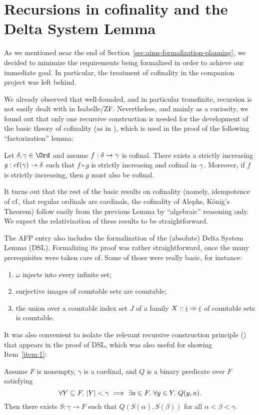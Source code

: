 \section{Recursions in cofinality and the Delta System Lemma}\label{sec:recursions-cofinality}

As we mentioned near the end of
Section~\ref{sec:aims-formalization-planning}, we decided to minimize
the requirements being formalized in order to achieve our immediate
goal. In particular, the treatment of cofinality in the companion
project \cite{Delta_System_Lemma-AFP} was left behind.

We already observed that well-founded, and in particular transfinite,
recursion is not easily dealt with in Isabelle/ZF. Nevertheless, and
mainly as a curiosity, we found out that only one recursive
construction is needed for the development of the basic theory of
cofinality (as in \cite[Sect.~I.13]{kunen2011set}), which is used in
the proof of the following “factorization” lemma:

\begin{lemma}
  Let $\del,\ga\in\Ord$ and assume $f:\delta\to\gamma$ is cofinal.  There exists
  a strictly increasing $g:\operatorname{cf}(\gamma)\to \delta$ such that $f\circ g$ is
  strictly increasing and cofinal in $\gamma$. Moreover, if $f$ is
  strictly increasing, then $g$ must also be cofinal.
\end{lemma}

It turns out that the rest of the basic results on cofinality (namely,
idempotence of $\operatorname{cf}$, that regular ordinals are cardinals, the
cofinality of Alephs, König's Theorem) follow easily from the previous
Lemma by “algebraic” reasoning only.
We expect the relativization of these
results to be straightforward.

The AFP entry \cite{Delta_System_Lemma-AFP} also includes the
formalization of the (absolute) Delta System Lemma (DSL). Formalizing its
proof was rather straightforward, once the many prerequisites were
taken care of. Some of those were really basic, for instance:
\begin{enumerate}
\item \label{item:1}$\omega$ injects into every infinite set;
\item \label{item:2}surjective images of countable sets are countable;
\item \label{item:3}the union over a countable index set $J$ of a family $X :: \tyi
  \fun \tyi$ of countable sets is countable.
\end{enumerate}
It was also convenient to isolate the relevant recursive construction
principle () that
appears in the proof of DSL, which was also useful for showing
Item~\ref{item:1}:
\begin{lemma}\label{lem:bdd-card-selection}
  Assume $F$ is nonempty,
  $\gamma$ is a cardinal, and $Q$ is a binary predicate over $F$ satisfying 
  \[
    \forall Y \subseteq F.\ |Y| < \gamma \implies \exists a\in F.\ \forall
    y\in Y.\ Q(y,a).
  \]
  Then there exists  $S:\gamma \to F$ such that
  $Q(S(\alpha),S(\beta))$ for all $\alpha<\beta<\gamma$.
\end{lemma}

